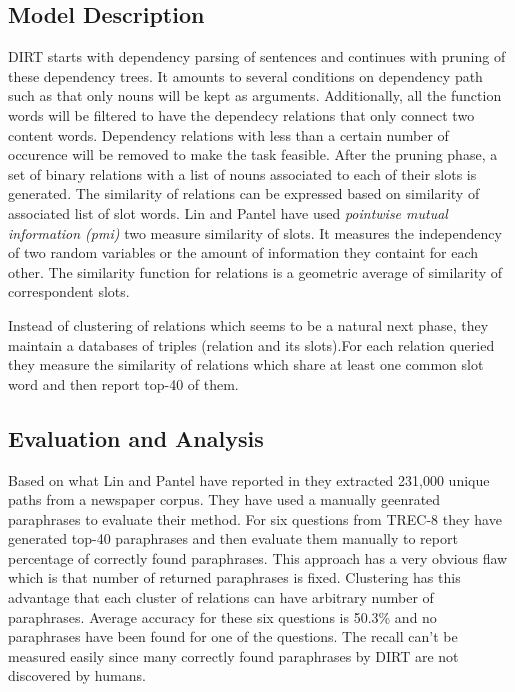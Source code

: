\documentclass[12pt]{report}
\begin{document}
\subsection{Model Description}
\label{ch:dirt-model} 
DIRT starts with dependency parsing of sentences and continues with pruning of these dependency trees.
It amounts to several conditions on dependency path such as that only nouns will be kept as arguments. 
Additionally, all the function words will be filtered to have the dependecy relations that only connect
two content words. Dependency relations with less than a certain number of occurence will be removed to make the task feasible.
After the pruning phase, a set of binary relations with a list of nouns associated to each of their slots is generated. 
The similarity of relations can be expressed based on similarity of associated list of slot words. Lin and Pantel
have used \emph{pointwise mutual information (pmi)} two measure similarity of slots. 
It measures the independency of two random variables or the amount of
information they containt for each other. The similarity function for relations  is a geometric average
of similarity of correspondent slots.

Instead of clustering of relations which seems to be a natural next phase,
 they maintain a databases of triples (relation and its slots).For each relation queried
  they measure the similarity of relations which share at least one common slot word and then report top-40 of them.
  
\subsection{Evaluation and Analysis}
\label{ch:model} 
  
  Based on what Lin and Pantel have reported in \cite{Lin2001} they extracted 231,000 unique paths from a newspaper corpus.
  They have used a manually geenrated paraphrases to evaluate their method. For six questions from TREC-8 
  they have generated top-40 paraphrases and then evaluate them manually to report percentage of correctly found paraphrases.
  This approach has a very obvious flaw which is that number of returned paraphrases is fixed. Clustering has this 
  advantage that each cluster of relations can have arbitrary number of paraphrases.
  Average accuracy for these six questions is 50.3\% and no paraphrases have been found for one of the questions.
  The recall can't be measured easily since many correctly found paraphrases by DIRT are not discovered by humans.
  
\end{document}
